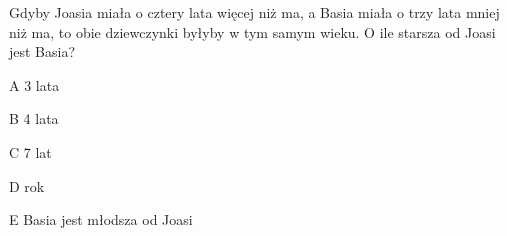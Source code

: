 \begin{tresc}
Gdyby Joasia miała o cztery lata więcej niż ma, a Basia miała o trzy lata mniej niż ma, to obie dziewczynki byłyby w tym samym wieku. O ile starsza od Joasi jest Basia?
\end{tresc}
\begin{wariant}{A} 3 lata \end{wariant}
\begin{wariant}{B} 4 lata \end{wariant}
\begin{wariant}{C} 7 lat \end{wariant}
\begin{wariant}{D} rok \end{wariant}
\begin{wariant}{E} Basia jest młodsza od Joasi \end{wariant}
